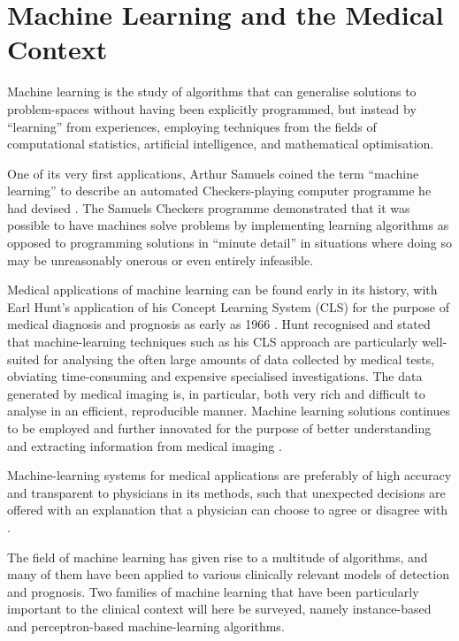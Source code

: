 \section{Machine Learning and the Medical Context}

Machine learning is the study of algorithms that can generalise solutions to problem-spaces without having been explicitly programmed, but instead by ``learning'' from experiences, employing techniques from the fields of computational statistics, artificial intelligence, and mathematical optimisation.

One of its very first applications, Arthur Samuels coined the term ``machine learning'' to describe an automated Checkers-playing computer programme he had devised \citep{samuel_draughts}. The Samuels Checkers programme demonstrated that it was possible to have machines solve problems by implementing learning algorithms as opposed to programming solutions in ``minute detail'' in situations where doing so may be unreasonably onerous or even entirely infeasible.

Medical applications of machine learning can be found early in its history, with Earl Hunt's application of his Concept Learning System (CLS) for the purpose of medical diagnosis and prognosis as early as 1966 \citep{hunt1966}. Hunt recognised and stated that machine-learning techniques such as his CLS approach are particularly well-suited for analysing the often large amounts of data collected by medical tests, obviating time-consuming and expensive specialised investigations. The data generated by medical imaging is, in particular, both very rich and difficult to analyse in an efficient, reproducible manner. Machine learning solutions continues to be employed and further innovated for the purpose of better understanding and extracting information from medical imaging \citep{med_imaging_review}.

Machine-learning systems for medical applications are preferably of high accuracy and transparent to physicians in its methods, such that unexpected decisions are offered with an explanation that a physician can choose to agree or disagree with \citep{med_ml_review}.

The field of machine learning has given rise to a multitude of algorithms, and many of them have been applied to various clinically relevant models of detection and prognosis. Two families of machine learning that have been particularly important to the clinical context will here be surveyed, namely instance-based and perceptron-based machine-learning algorithms.

